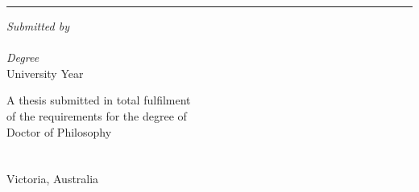 \begin{titlepage}
  \doublespacing
  \large
  \hfill
  \vfill
  \vspace*{0.5cm}
  \begin{center}
    \doublespacing
    \textcolor{Maroon}{\huge\textbf{\myTitle}}
  \end{center}
  \vspace{1.25cm}
  \hrule
  \vspace{1.5cm}
  \onehalfspacing
  \begin{center}

    \begin{minipage}[t]{\textwidth}
      \centering
        \emph{Submitted by}\\
        \href{\myWebsite}{{\myFirstName} \textsc{\myLastName}}\\
        \emph{Degree} \\
        University Year
    \end{minipage}


    \hfill
    \vfill
    
    A thesis submitted in total fulfilment\\
    of the requirements for the degree of\\
    {Doctor of Philosophy}\\[1cm]
    
    \mySchool\\

    \href{https://latrobe.edu.au}{\myUni}\\
    Victoria, Australia\\[2em]
    {\mySubmissionMonth} {\mySubmissionYear}
  \end{center}
\end{titlepage}
